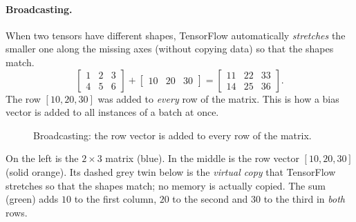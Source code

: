 \paragraph{Broadcasting.} When two tensors have different shapes, TensorFlow automatically \emph{stretches} the smaller one along the missing axes (without copying data) so that the shapes match.
\[
  \begin{bmatrix}1&2&3\\4&5&6\end{bmatrix}+\begin{bmatrix}10&20&30\end{bmatrix}
  =\begin{bmatrix}11&22&33\\14&25&36\end{bmatrix}.
\]
The row $[10,20,30]$ was added to \emph{every} row of the matrix. This is how a bias vector is added to all instances of a batch at once.

\begin{figure}[!htbp]
\centering
{}
\caption{Broadcasting: the row vector is added to every row of the matrix.}\label{fig:broadcast}
\end{figure}

\begin{explain}
On the left is the $2\times3$ matrix (blue). In the middle is the row vector $[10,20,30]$ (solid orange). Its dashed grey twin below is the \emph{virtual copy} that TensorFlow stretches so that the shapes match; no memory is actually copied. The sum (green) adds $10$ to the first column, $20$ to the second and $30$ to the third in \emph{both} rows.
\end{explain}

